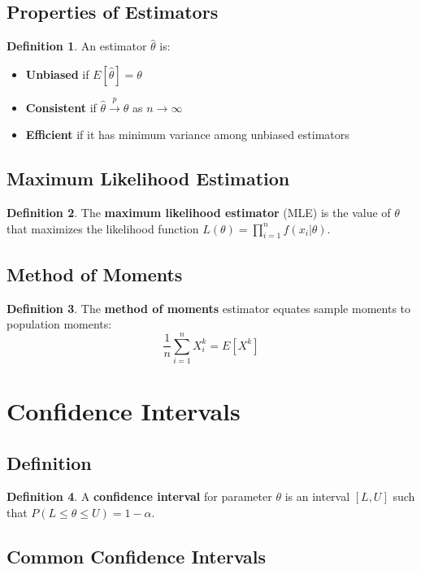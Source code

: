 \documentclass[11pt]{article}
\theoremstyle{definition}
\newtheorem{definition}{Definition}[section]
\begin{document}
\subsection{Properties of Estimators}
\begin{definition}
An estimator $\hat{\theta}$ is:
\begin{itemize}
    \item \textbf{Unbiased} if $E[\hat{\theta}] = \theta$
    \item \textbf{Consistent} if $\hat{\theta} \xrightarrow{p} \theta$ as $n \to \infty$
    \item \textbf{Efficient} if it has minimum variance among unbiased estimators
\end{itemize}
\end{definition}

\subsection{Maximum Likelihood Estimation}
\begin{definition}
The \textbf{maximum likelihood estimator} (MLE) is the value of $\theta$ that maximizes the likelihood function $L(\theta) = \prod_{i=1}^n f(x_i|\theta)$.
\end{definition}

\subsection{Method of Moments}
\begin{definition}
The \textbf{method of moments} estimator equates sample moments to population moments:
$$\frac{1}{n}\sum_{i=1}^n X_i^k = E[X^k]$$
\end{definition}

\section{Confidence Intervals}

\subsection{Definition}
\begin{definition}
A \textbf{confidence interval} for parameter $\theta$ is an interval $[L, U]$ such that $P(L \leq \theta \leq U) = 1 - \alpha$.
\end{definition}

\subsection{Common Confidence Intervals}
\end{document}
